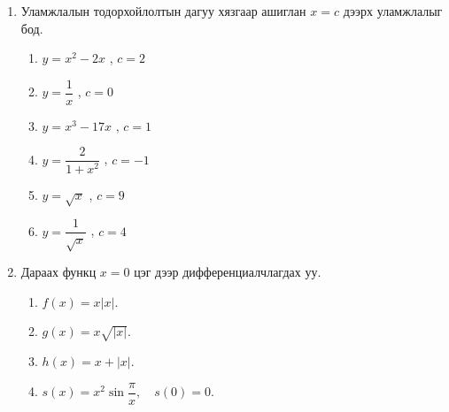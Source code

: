 \begin{enumerate}
\begin{enumerate}[label=(\alph*)]
    \item $t=2$ үеийн унах эгшин зуурын хурдыг ол.
    \item $\alpha$ өнцөгийг ол.
\end{enumerate}
\item Уламжлалын тодорхойлолтын дагуу хязгаар ашиглан $x=c$ дээрх уламжлалыг бод.
\begin{enumerate}[label=(\alph*)]
  \item $y = x^{2} - 2x$ , $c=2$
  \item $y = \dfrac{1}{x}$  , $c=0$
  \item $y = x^{3} - 17x$ , $c=1$
  \item $y = \dfrac{2}{1 + x^{2}}$  , $c=-1$
  \item $y = \sqrt{x}$  , $c=9$
  \item $y = \dfrac{1}{\sqrt{x}}$  , $c=4$
\end{enumerate}
\item 
Дараах функц $x=0$ цэг дээр дифференциалчлагдах уу.
\begin{enumerate}[label=(\alph*)]
  \item $f(x) = x|x|.$
  \item $g(x) = x\sqrt{|x|}.$
  \item $h(x) = x + |x|.$
  \item $s(x) = x^{2}\sin\dfrac{\pi}{x}, \quad s(0)=0.$
\end{enumerate}
\end{enumerate}
\newpage

